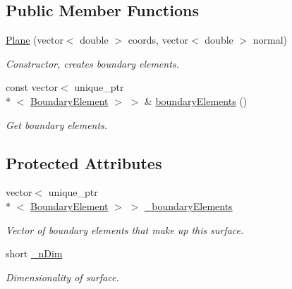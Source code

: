 \subsection*{Public Member Functions}
\begin{DoxyCompactItemize}
\item 
\hyperlink{classPlane_ab3c3044eb98fc177214d46988b5b2891}{Plane} (vector$<$ double $>$ coords, vector$<$ double $>$ normal)
\begin{DoxyCompactList}\small\item\em Constructor, creates boundary elements. \end{DoxyCompactList}\item 
const vector$<$ unique\+\_\+ptr\\*
$<$ \hyperlink{classBoundaryElement}{Boundary\+Element} $>$ $>$ \& \hyperlink{classBoundarySurface_a402dcf23f4f96110569d01e401edee5a}{boundary\+Elements} ()
\begin{DoxyCompactList}\small\item\em Get boundary elements. \end{DoxyCompactList}\end{DoxyCompactItemize}
\subsection*{Protected Attributes}
\begin{DoxyCompactItemize}
\item 
vector$<$ unique\+\_\+ptr\\*
$<$ \hyperlink{classBoundaryElement}{Boundary\+Element} $>$ $>$ \hyperlink{classBoundarySurface_a67f60b2d22fb67f097e98025803d3d34}{\+\_\+boundary\+Elements}
\begin{DoxyCompactList}\small\item\em Vector of boundary elements that make up this surface. \end{DoxyCompactList}\item 
short \hyperlink{classBoundarySurface_af3ed79310c6ba6cdc8e9f176bf463eb1}{\+\_\+n\+Dim}
\begin{DoxyCompactList}\small\item\em Dimensionality of surface. \end{DoxyCompactList}\end{DoxyCompactItemize}
